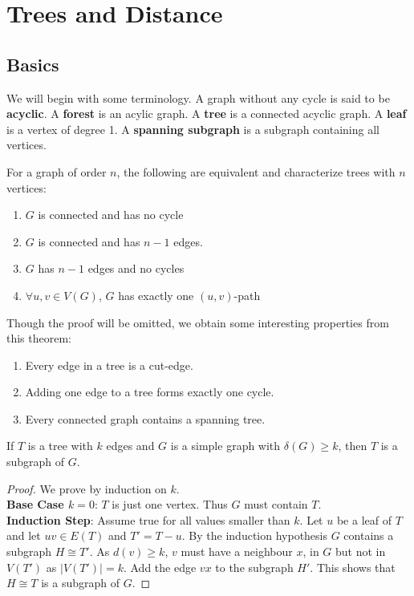 \chapter{Trees and Distance}

\section{Basics}%
\label{sec:2.1}

We will begin with some terminology.
A graph without any cycle is said to be \textbf{acyclic}. A \textbf{forest} is an acylic graph. A \textbf{tree} is a connected acyclic graph. A \textbf{leaf} is a vertex of degree 1. A \textbf{spanning subgraph} is a subgraph containing all vertices.

\begin{theorem}
	For a graph of order $n$, the following are equivalent and characterize trees with $n$ vertices:
	\begin{enumerate}
		\item $G$ is connected and has no cycle
		\item $G$ is connected and has $n-1$ edges.
		\item $G$ has $n-1$ edges and no cycles
		\item $\forall u,v \in V(G)$, $G$ has exactly one $(u,v)$-path
	\end{enumerate}
\end{theorem}
Though the proof will be omitted, we obtain some interesting properties from this theorem:
\begin{enumerate}
	\item Every edge in a tree is a cut-edge.
	\item Adding one edge to a tree forms exactly one cycle.
	\item Every connected graph contains a spanning tree.
\end{enumerate}

\begin{proposition}
	If $T$ is a tree with $k$ edges and $G$ is a simple graph with \(\delta(G) \ge k\), then $T$ is a subgraph of $G$.
\end{proposition}

\begin{proof}
	We prove by induction on $k$.\\
	\noindent
	\textbf{Base Case $k = 0$}: $T$ is just one vertex. Thus $G$ must contain $T$.\\
	\noindent
	\textbf{Induction Step}: Assume true for all values smaller than $k$. Let $u$ be a leaf of $T$ and let $uv \in E(T)$ and $T' = T - u$. By the induction hypothesis $G$ contains a subgraph $H \cong T'$. As $d(v) \ge k$, $v$ must have a neighbour $x$, in $G$ but not in $V(T')$ as $|V(T')| = k$. Add the edge $vx$ to the subgraph $H'$. This shows that $H \cong T$ is a subgraph of $G$.
\end{proof}

